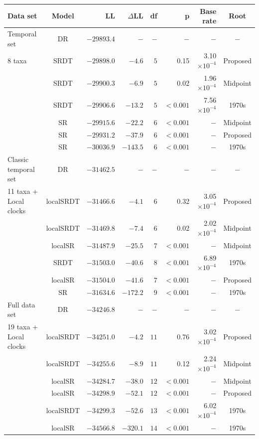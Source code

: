 
    \begin{tabular}{lcrrrrrc}
    Data set & Model & LL & $\Delta$LL & df & p & Base rate & Root  \\ 
\toprule
Temporal set & DR & $−29893.4$ & $- $ & $- $ & $-$ & $-$ & $-$ \\ 
8 taxa & SRDT & $−29898.0$ & $−4.6 $ & $5 $ & 0.15 & 3.10$ \times 10^{-4}$ & Proposed \\ 
  & SRDT & $−29900.3$ & $−6.9 $ & $5 $ & 0.02 & 1.96$ \times 10^{-4}$ & Midpoint \\ 
  & SRDT & $−29906.6$ & $−13.2 $ & $5 $ & $<0.001$ & 7.56$ \times 10^{-4}$ & 1970s \\ 
  & SR & $−29915.6$ & $−22.2 $ & $6 $ & $<0.001$ & $-$ & Midpoint \\ 
  & SR & $−29931.2$ & $−37.9 $ & $6 $ & $<0.001$ & $-$ & Proposed \\ 
  & SR & $−30036.9$ & $−143.5 $ & $6 $ & $<0.001$ & $-$ & 1970s \\ 
\midrule
Classic temporal set & DR & $−31462.5$ & $- $ & $- $ & $-$ & $-$ & $-$ \\ 
11 taxa + Local clocks & localSRDT & $−31466.6$ & $−4.1 $ & $6 $ & 0.32 & 3.05$ \times 10^{-4}$ & Proposed \\ 
  & localSRDT & $−31469.8$ & $−7.4 $ & $6 $ & 0.02 & 2.02$ \times 10^{-4}$ & Midpoint \\ 
  & localSR & $−31487.9$ & $−25.5 $ & $7 $ & $<0.001$ & $-$ & Midpoint \\ 
  & SRDT & $−31503.0$ & $−40.6 $ & $8 $ & $<0.001$ & 6.89$ \times 10^{-4}$ & 1970s \\ 
  & localSR & $−31504.0$ & $−41.6 $ & $7 $ & $<0.001$ & $-$ & Proposed \\ 
  & SR & $−31634.6$ & $−172.2 $ & $9 $ & $<0.001$ & $-$ & 1970s \\ 
\midrule
Full data set & DR & $−34246.8$ & $- $ & $- $ & $-$ & $-$ & $-$ \\ 
19 taxa + Local clocks & localSRDT & $−34251.0$ & $−4.2 $ & $11 $ & 0.76 & 3.02$ \times 10^{-4}$ & Proposed \\ 
  & localSRDT & $−34255.6$ & $−8.9 $ & $11 $ & 0.12 & 2.24$ \times 10^{-4}$ & Midpoint \\ 
  & localSR & $−34284.7$ & $−38.0 $ & $12 $ & $<0.001$ & $-$ & Midpoint \\ 
  & localSR & $−34298.9$ & $−52.1 $ & $12 $ & $<0.001$ & $-$ & Proposed \\ 
  & localSRDT & $−34299.3$ & $−52.6 $ & $13 $ & $<0.001$ & 6.02$ \times 10^{-4}$ & 1970s \\ 
  & localSR & $−34566.8$ & $−320.1 $ & $14 $ & $<0.001$ & $-$ & 1970s \\ 
\bottomrule
\end{tabular}